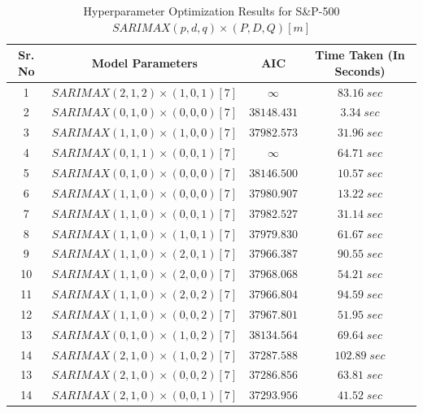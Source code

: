 \documentclass[conference]{IEEEtran}
\begin{document}
\begin{table}[htbp]
    \setlength{\tabcolsep}{20pt}
    \renewcommand{\arraystretch}{1.2}
    \centering
    \caption{Hyperparameter Optimization Results for S\&P-500 $SARIMAX(p, d, q) \times (P, D, Q)[m]$}
    \begin{tabular}{|c|c|c|c|}
        \hline
        Sr. No & Model Parameters & AIC & Time Taken (In Seconds) \\
        \hline
        1 &  $SARIMAX(2, 1, 2) \times (1, 0, 1)[7]$ & $\infty$ & $83.16 \; sec$ \\
        \hline
        2 &  $SARIMAX(0, 1, 0) \times (0, 0, 0)[7]$ & $38148.431$ & $3.34 \; sec$ \\
        \hline
        3 &  $SARIMAX(1, 1, 0) \times (1, 0, 0)[7]$ & $37982.573$ & $31.96 \; sec$ \\
        \hline
        4 &  $SARIMAX(0, 1, 1) \times (0, 0, 1)[7]$ & $\infty$ & $64.71 \; sec$ \\
        \hline
        5 &  $SARIMAX(0, 1, 0) \times (0, 0, 0)[7]$ & $38146.500$ & $10.57 \; sec$ \\
        \hline
        6 &  $SARIMAX(1, 1, 0) \times (0, 0, 0)[7]$ & $37980.907$ & $13.22 \; sec$ \\
        \hline
        7 &  $SARIMAX(1, 1, 0) \times (0, 0, 1)[7]$ & $37982.527$ & $31.14 \; sec$ \\
        \hline
        8 &  $SARIMAX(1, 1, 0) \times (1, 0, 1)[7]$ & $37979.830$ & $61.67 \; sec$ \\
        \hline
        9 &  $SARIMAX(1, 1, 0) \times (2, 0, 1)[7]$ & $37966.387$ & $90.55 \; sec$ \\
        \hline
        10 &  $SARIMAX(1, 1, 0) \times (2, 0, 0)[7]$ & $37968.068$ & $54.21 \; sec$ \\
        \hline
        11 &  $SARIMAX(1, 1, 0) \times (2, 0, 2)[7]$ & $37966.804$ & $94.59 \; sec$ \\
        \hline
        12 &  $SARIMAX(1, 1, 0) \times (0, 0, 2)[7]$ & $37967.801$ & $51.95 \; sec$ \\
        \hline
        13 &  $SARIMAX(0, 1, 0) \times (1, 0, 2)[7]$ & $38134.564$ & $69.64 \; sec$ \\
        \hline
        14 &  $SARIMAX(2, 1, 0) \times (1, 0, 2)[7]$ & $37287.588$ & $102.89 \; sec$ \\
        \hline
        13 &  $SARIMAX(2, 1, 0) \times (0, 0, 2)[7]$ & $37286.856$ & $63.81 \; sec$ \\
        \hline
        14 &  $SARIMAX(2, 1, 0) \times (0, 0, 1)[7]$ & $37293.956$ & $41.52 \; sec$ \\

\end{tabular}
\end{table}
\end{document}
